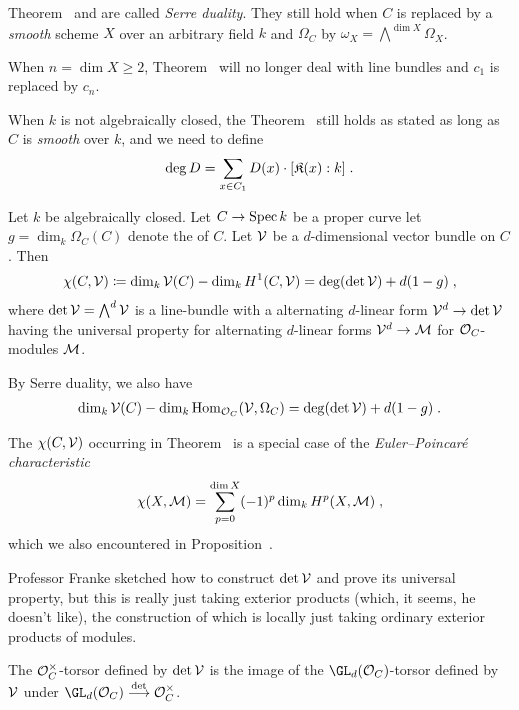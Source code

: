 \documentclass[a4paper,parskip=half,numbers=enddot, DIV=12]{scrreprt}
\renewcommand{\geq}{\geqslant}
\begin{document}
\begin{rem*}
	\begin{alphanumerate}
		\item Theorem~ and  are called \emph{Serre duality}. They still hold when $C$ is replaced by a \emph{smooth} scheme $X$ over an arbitrary field $k$ and $\Omega_C$ by $\omega_X=\bigwedge^{\dim X}\Omega_X$.
		\item When $n=\dim X\geq 2$, Theorem~ will no longer deal with line bundles and $c_1$ is replaced by $c_n$.
		\item When $k$ is not algebraically closed, the Theorem~ still holds as stated as long as $C$ is \emph{smooth} over $k$, and we need to define
		\begin{align*}
			\deg D=\sum_{x\in C_1} D(x)\cdot [\mathfrak{K}(x):k]\;.
		\end{align*}
	\end{alphanumerate}
\end{rem*}
\begin{thm}
	Let $k$ be algebraically closed. Let $C\morphism\Spec k$ be a proper curve let $g=\dim_k\Omega_C(C)$ denote the  of $C$. Let $\mathcal{V}$ be a $d$-dimensional vector bundle on $C$. Then
	\begin{align}\lbl{eq:RiemannRoch1}
		\chi(C,\Vv)\coloneqq\dim_k\Vv(C)-\dim_k H^1(C,\Vv)=\deg(\det\Vv)+d(1-g)\;,
	\end{align}
	where $\operatorname{det} \mathcal{V}=\bigwedge^d\mathcal{V}$ is a line-bundle with a alternating $d$-linear form $\Vv^d\morphism\det\Vv$ having the universal property for alternating $d$-linear forms $\Vv^d\morphism\Mm$ for $\mathcal{O}_C$-modules $\mathcal{M}$.
	
	By Serre duality, we also have
	\begin{align}\lbl{eq:RiemannRoch2}
		\dim_k\Vv(C)-\dim_k\Hom_{\Oo_C}(\Vv,\Omega_C)=\deg(\det\Vv)+d(1-g)\;.
	\end{align}
\end{thm}
\begin{rem*}
	\begin{alphanumerate}
		\item The $\chi(C,\mathcal{V})$ occurring in Theorem~ is a special case of the \emph{Euler--Poincaré characteristic}
		\begin{align*}
			\chi(X,\mathcal{M})=\sum_{p=0}^{\dim X}(-1)^p\dim_kH^p(X,\mathcal{M})\;,
		\end{align*}
		which we also encountered in Proposition~\reff{prop:SerreAgain}.
		\item Professor Franke sketched how to construct $\operatorname{det}\mathcal{V}$ and prove its universal property, but this is really just taking exterior products (which, it seems, he doesn't like), the construction of which is locally just taking ordinary  exterior products of modules.
		
		The $\mathcal{O}_C^\times$-torsor defined by $\operatorname{det}\mathcal{V}$ is the image of the $\GL_d(\Oo_C)$-torsor defined by $\mathcal{V}$ under $\GL_d(\Oo_C)\morphism[\det]\Oo_C^\times$.
	\end{alphanumerate}
\end{rem*}
\end{document}
